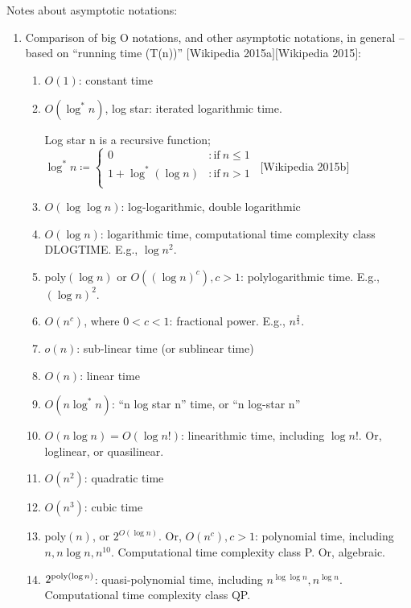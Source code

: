 Notes about asymptotic notations: \vspace{-0.3cm}
\begin{enumerate} \itemsep -4pt
\item Comparison of big O notations, and other asymptotic notations, in general -- based on ``running time (T(n))'' $[$Wikipedia 2015a$] [$Wikipedia 2015$]$: \vspace{-0.3cm}
	\begin{enumerate} \itemsep -2pt
	\item $O(1)$: constant time
	\item $O(\log^{\ast} n)$, log star: iterated logarithmic time.

	Log star n is a recursive function; $\log^{\ast} n \coloneqq
		\begin{cases}
		0 &: \mathrm{if}\ n \leq 1 \\
		1 + \log^{\ast}(\log n) &: \mathrm{if}\ n > 1 \\
		\end{cases}$\ $[$Wikipedia 2015b$]$
	\item $O(\log \log n)$: log-logarithmic, double logarithmic
	\item $O(\log n)$: logarithmic time, computational time complexity class DLOGTIME. E.g., $\log n^{2}$.
	\item poly$(\log n)$ or $O((\log n)^{c}), c > 1$: polylogarithmic time. E.g., $(\log n)^{2}$.
	\item $O(n^{c})$, where $0 < c < 1$: fractional power. E.g., $n^{\frac{2}{3}}$.
	\item $o(n)$: sub-linear time (or sublinear time)
	\item $O(n)$: linear time
	\item $O(n \log^{\ast} n)$: ``n log star n'' time, or ``n log-star n''
	\item $O(n \log n) = O(\log n!)$: linearithmic time, including $\log n!$. Or, loglinear, or quasilinear.
	\item $O(n^{2})$: quadratic time
	\item $O(n^{3})$: cubic time
	\item poly$(n)$, or $2^{O(\log n)}$. Or, $O(n^{c}), c > 1$: polynomial time, including $n, n \log n, n^{10}$. Computational time complexity class P. Or, algebraic.
	\item $2^{{\rm poly}(\log n)}$: quasi-polynomial time, including $n^{\log \log n}, n^{\log n}$. Computational time complexity class QP.

\end{enumerate}
\end{enumerate}
